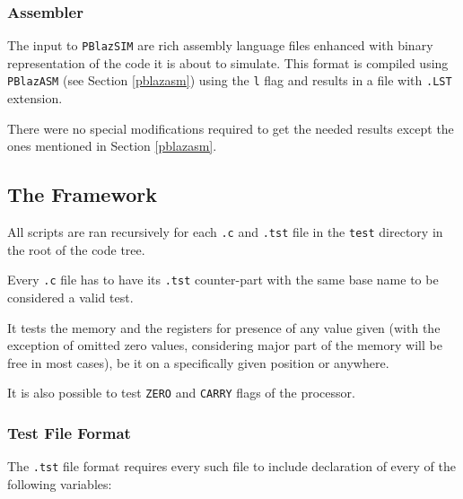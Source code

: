             \subsubsection{Assembler}

                The input to \texttt{PBlazSIM} are rich assembly language files enhanced with binary representation of the code it is about to simulate. This format is compiled using \texttt{PBlazASM} (see Section \ref{pblazasm}) using the \texttt{\-l} flag and results in a file with \texttt{.LST} extension.

                There were no special modifications required to get the needed results except the ones mentioned in Section \ref{pblazasm}.
\newpage
        \subsection{The Framework}

        All scripts are ran recursively for each \texttt{.c} and \texttt{.tst} file in the \texttt{test} directory in the root of the code tree.

        Every \texttt{.c} file has to have its \texttt{.tst} counter-part with the same base name to be considered a valid test.

        It tests the memory and the registers for presence of any value given (with the exception of omitted zero values, considering major part of the memory will be free in most cases), be it on a specifically given position or anywhere.

        It is also possible to test \texttt{ZERO} and \texttt{CARRY} flags of the processor.

            \subsubsection{Test File Format}

            The \texttt{.tst} file format requires every such file to include declaration of every of the following variables:

